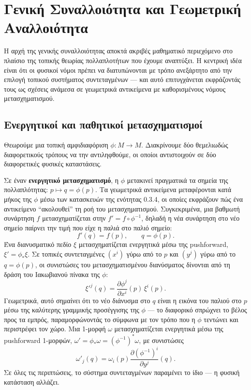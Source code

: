 \documentclass[12pt]{article}
\begin{document}
\section{Γενική Συναλλοιότητα και Γεωμετρική Αναλλοιότητα}

Η αρχή της γενικής συναλλοιότητας αποκτά ακριβές μαθηματικό περιεχόμενο στο πλαίσιο της τοπικής θεωρίας πολλαπλοτήτων που έχουμε αναπτύξει. Η κεντρική ιδέα είναι ότι οι φυσικοί νόμοι πρέπει να διατυπώνονται με τρόπο ανεξάρτητο από την επιλογή τοπικού συστήματος συντεταγμένων — και αυτό επιτυγχάνεται εκφράζοντάς τους ως σχέσεις ανάμεσα σε γεωμετρικά αντικείμενα με καθορισμένους νόμους μετασχηματισμού.

\subsection{Ενεργητικοί και παθητικοί μετασχηματισμοί}

Θεωρούμε μια τοπική αμφιδιαφόριση $\phi: M \to M$. Διακρίνουμε δύο θεμελιωδώς διαφορετικούς τρόπους να την αντιληφθούμε, οι οποίοι αντιστοιχούν σε δύο διαφορετικές φυσικές καταστάσεις.

Σε έναν \textbf{ενεργητικό μετασχηματισμό}, η $\phi$ μετακινεί πραγματικά τα σημεία της πολλαπλότητας: $p \mapsto q = \phi(p)$. Τα γεωμετρικά αντικείμενα μεταφέρονται κατά μήκος της $\phi$ μέσω των κατασκευών της ενότητας 0.3.4, οι οποίες εκφράζουν πώς ένα αντικείμενο ``ακολουθεί'' τη ροή του μετασχηματισμού. Συγκεκριμένα, μια βαθμωτή συνάρτηση $f$ μετασχηματίζεται στην $f' = f \circ \phi^{-1}$, δηλαδή η νέα συνάρτηση στο νέο σημείο παίρνει την τιμή που είχε η παλιά στο παλιό σημείο:
\[
f'(q) = f(p), \qquad q = \phi(p). \tag{0.29}
\]
Ένα διανυσματικό πεδίο $\xi$ μετασχηματίζεται ενεργητικά μέσω της pushforward, $\xi' = \phi_* \xi$. Σε τοπικές συντεταγμένες $(x^i)$ γύρω από το $p$ και $(y^j)$ γύρω από το $q = \phi(p)$, οι συνιστώσες του μετασχηματισμένου διανύσματος δίνονται από τη δράση του Ιακωβιανού πίνακα της $\phi$:
\[
\xi'^j(q) = \frac{\partial \phi^j}{\partial x^i}(p) \, \xi^i(p). \tag{0.30}
\]
Γεωμετρικά, αυτό σημαίνει ότι το νέο διάνυσμα στο $q$ είναι η εικόνα του παλιού στο $p$ μέσω της καλύτερης γραμμικής προσέγγισης της $\phi$ — το διαφορικό σπρώχνει το βέλος προς τα εμπρός, παραμορφώνοντάς το σύμφωνα με τον τρόπο που η $\phi$ τεντώνει και περιστρέφει τον χώρο. Μια 1-μορφή $\omega$ μετασχηματίζεται ενεργητικά μέσω της pushforward 1-μορφών, $\omega' = \phi_* \omega = (\phi^{-1})^* \omega$, με συνιστώσες
\[
\omega'_j(q) = \omega_i(p) \frac{\partial (\phi^{-1})^i}{\partial y^j}(q). \tag{0.31}
\]
Σε όλες τις περιπτώσεις, το σύστημα συντεταγμένων παραμένει το ίδιο — η φυσική κατάσταση αλλάζει.
\end{document}
